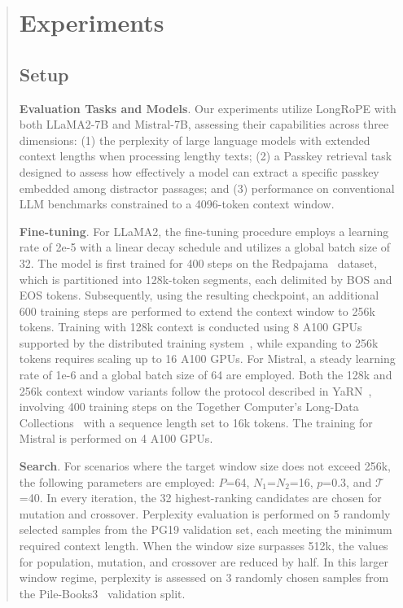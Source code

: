 \begin{abstract}
 \section{Experiments}

\label{sec:exp}
\subsection{Setup}
\textbf{Evaluation Tasks and Models}. Our experiments utilize LongRoPE with both LLaMA2-7B and Mistral-7B, assessing their capabilities across three dimensions: (1) the perplexity of large language models with extended context lengths when processing lengthy texts; (2) a Passkey retrieval task designed to assess how effectively a model can extract a specific passkey embedded among distractor passages; and (3) performance on conventional LLM benchmarks constrained to a 4096-token context window.

\textbf{Fine-tuning}. For LLaMA2, the fine-tuning procedure employs a learning rate of 2e-5 with a linear decay schedule and utilizes a global batch size of 32. The model is first trained for 400 steps on the Redpajama~\cite{redpajama} dataset, which is partitioned into 128k-token segments, each delimited by BOS and EOS tokens. Subsequently, using the resulting checkpoint, an additional 600 training steps are performed to extend the context window to 256k tokens. Training with 128k context is conducted using 8 A100 GPUs supported by the distributed training system~\cite{cube}, while expanding to 256k tokens requires scaling up to 16 A100 GPUs. For Mistral, a steady learning rate of 1e-6 and a global batch size of 64 are employed. Both the 128k and 256k context window variants follow the protocol described in YaRN~\cite{yarn}, involving 400 training steps on the Together Computer's Long-Data Collections~\cite{mistraldata} with a sequence length set to 16k tokens. The training for Mistral is performed on 4 A100 GPUs.

\textbf{Search}. For scenarios where the target window size does not exceed 256k, the following parameters are employed: $P$=64, $N_1$=$N_2$=16, $p$=0.3, and $\mathcal{T}$=40. In every iteration, the 32 highest-ranking candidates are chosen for mutation and crossover. Perplexity evaluation is performed on 5 randomly selected samples from the PG19 validation set, each meeting the minimum required context length. When the window size surpasses 512k, the values for population, mutation, and crossover are reduced by half. In this larger window regime, perplexity is assessed on 3 randomly chosen samples from the Pile-Books3~\cite{pile} validation split.


\end{abstract}
